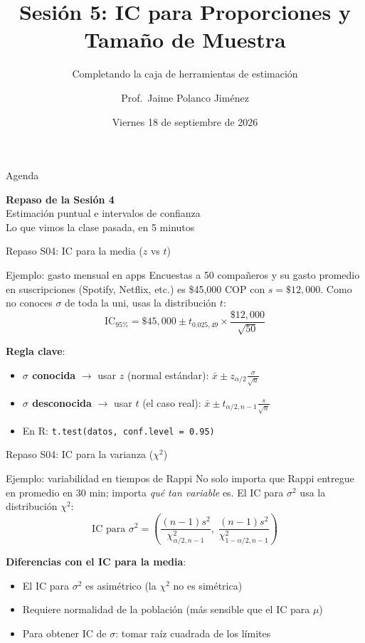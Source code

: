 \documentclass[aspectratio=169, 11pt]{beamer}
\title{Sesión 5: IC para Proporciones y Tamaño de Muestra}
\subtitle{Completando la caja de herramientas de estimación}
\author{Prof.\ Jaime Polanco Jim\'enez}
\date{Viernes 18 de septiembre de 2026}
\begin{document}
\begin{frame}
\titlepage
\end{frame}

\begin{frame}{Agenda}
\tableofcontents
\end{frame}

\begin{frame}{}
\vfill
\centering
{\Large\textbf{Repaso de la Sesi\'on 4}}\\[1em]
{\normalsize Estimaci\'on puntual e intervalos de confianza}\\[0.5em]
{\small Lo que vimos la clase pasada, en 5 minutos}
\vfill
\end{frame}

\begin{frame}{Repaso S04: IC para la media ($z$ vs $t$)}
\small
\begin{exampleblock}{Ejemplo: gasto mensual en apps}
Encuestas a 50 compa\~neros y su gasto promedio en suscripciones (Spotify, Netflix, etc.) es \$45{,}000 COP con $s = \$12{,}000$. Como no conoces $\sigma$ de toda la uni, usas la distribuci\'on $t$:
\[
\text{IC}_{95\%} = \$45{,}000 \pm t_{0.025, 49} \times \frac{\$12{,}000}{\sqrt{50}}
\]
\end{exampleblock}

\textbf{Regla clave}:
\begin{itemize}\setlength{\itemsep}{1pt}
  \item \textbf{$\sigma$ conocida} $\to$ usar $z$ (normal est\'andar): $\bar{x} \pm z_{\alpha/2} \frac{\sigma}{\sqrt{n}}$
  \item \textbf{$\sigma$ desconocida} $\to$ usar $t$ (el caso real): $\bar{x} \pm t_{\alpha/2, n-1} \frac{s}{\sqrt{n}}$
  \item En R: \texttt{t.test(datos, conf.level = 0.95)}
\end{itemize}
\end{frame}

\begin{frame}{Repaso S04: IC para la varianza ($\chi^2$)}
\small
\begin{exampleblock}{Ejemplo: variabilidad en tiempos de Rappi}
No solo importa que Rappi entregue en promedio en 30 min; importa \emph{qu\'e tan variable} es. El IC para $\sigma^2$ usa la distribuci\'on $\chi^2$:
\[
\text{IC para } \sigma^2 = \left(\frac{(n-1)s^2}{\chi^2_{\alpha/2, n-1}}, \; \frac{(n-1)s^2}{\chi^2_{1-\alpha/2, n-1}}\right)
\]
\end{exampleblock}

\textbf{Diferencias con el IC para la media}:
\begin{itemize}\setlength{\itemsep}{1pt}
  \item El IC para $\sigma^2$ es \alert{asim\'etrico} (la $\chi^2$ no es sim\'etrica)
  \item Requiere \alert{normalidad} de la poblaci\'on (m\'as sensible que el IC para $\mu$)
  \item Para obtener IC de $\sigma$: tomar ra\'iz cuadrada de los l\'imites
\end{itemize}
\end{frame}
\end{document}
